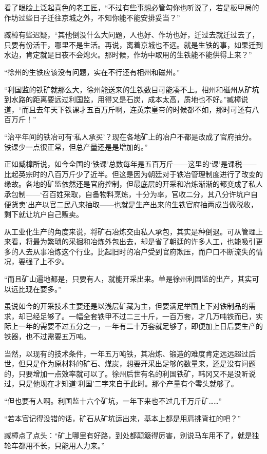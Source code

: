 看了眼脸上泛起喜色的老工匠，“不过有些事想必管勾你也听说了，若是板甲局的作坊过些日子迁往京城之外，不知你能不能安排妥当？”

臧樟有些迟疑，“其他倒没什么大问题，人也好、作坊也好，迁过去就迁过去了，只要有份活干，哪里不是生活。再说，离着京城也不远。就是生铁的事，如果迁到水边，肯定就是日夜不会熄火。那时候，作坊中取用的生铁能不能供得上来？”

“徐州的生铁应该没有问题，实在不行还有相州和磁州。”

“利国监的铁矿就那么大，徐州能送来的生铁数目可能凑不上。相州和磁州从矿坑到水路的距离要远过利国监，用得又是石炭，成本太高，质地也不好。”臧樟说道，“而且去年天下铁课才五百万斤啊，连英宗皇帝的时候都不如，那时可还有八百万斤！”

“治平年间的铁冶可有‘私人承买’？现在各地矿上的冶户不都是改成了官府抽分。铁课少一点很正常，但总产量还是是增加的。”

正如臧樟所说，如今全国的‘铁课’总数每年是五百万斤——这里的‘课’是课税——比起英宗时的八百万斤少了近半。但这是因为朝廷对于铁冶管理制度进行了改变的缘故。各地的矿监依然还是官府控制，但最底层的开采和冶炼渐渐的都变成了私人承包制——‘召百姓采取，自备物料烹炼，十分为率，官收二分，其八分许坑户自便货卖’出产以官二民八来抽取——也就是生产出来的生铁官府抽两成当做税收，剩下就让坑户自己贩卖。

从工业化生产的角度来说，将矿石冶炼交由私人承包，其实是种倒退。可从管理上来看，将最为繁琐的采掘和冶炼外包出去，却是省了朝廷的许多人工，也能吸引更多的人去从事冶炼这个行业。比起旧时的冶户受到官府欺压，而户口不断流失的情况，要强了上不少。

“而且矿山遍地都是，只要有人，就能开采出来。单是徐州利国监的出产，其实可以远比现在要多。”

虽说如今的开采技术主要还是以浅层矿藏为主，但要满足举国上下对铁制品的需求，却已经足够了。一幅全套铁甲不过二三十斤，一百万套，才几万吨铁而已，实际上一年的需要不过五分之一，一年有二十万套就足够了，即便加上日后要生产的铁器，也不过需要五万吨。

当然，以现有的技术条件，一年五万吨铁，其冶炼、锻造的难度肯定远远超过后世，但只是作为原材料的矿石、煤炭，想要开采出足够的数量来，还是没有问题的，只要增加一点效率就可以了。徐州后世有名的利国铁矿，韩冈又不是没听说过，只是他现在才知道‘利国’二字来自于此时。那个产量有个零头就够了。

“但也要有人啊。利国监十六个矿坑，一年下来也不过几千万斤矿……”

“若本官记得没错的话，矿石从矿坑运出来，基本上都是用肩挑背扛的吧？”

臧樟点了点头：“矿上哪里有好路，到处都颠簸得厉害，别说马车用不了，就是独轮车都用不长，只能用人力来。”

